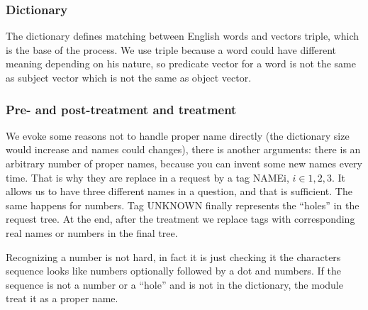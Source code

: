 

\subsubsection{Dictionary}

The dictionary defines matching between English words and vectors triple, which is the base of the process. We use triple because a word could have different meaning depending on his nature, so predicate vector for a word is not the same as subject vector which is not the same as object vector.

\subsubsection{Pre- and post-treatment and treatment}

We evoke some reasons not to handle proper name directly (the dictionary size would increase and names could changes), there is another arguments: there is an arbitrary number of proper names, because you can invent some new names every time. That is why they are replace in a request by a tag NAMEi, $i\in{1,2,3}$. It allows us to have three different names in a question, and that is sufficient. The same happens for numbers. Tag UNKNOWN finally represents the ``holes'' in the request tree. At the end, after the treatment we replace tags with corresponding real names or numbers in the final tree.

Recognizing a number is not hard, in fact it is just checking it the characters sequence looks like numbers optionally followed by a dot and numbers. If the sequence is not a number or a ``hole'' and is not in the dictionary, the module treat it as a proper name.


